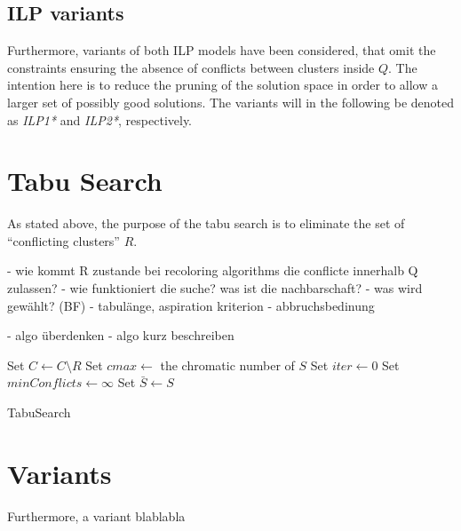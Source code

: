 \subsection{ILP variants}

Furthermore, variants of both ILP models have been considered, that omit the constraints ensuring the absence of conflicts between clusters inside $Q$. The intention here is to reduce the pruning of the solution space in order to allow a larger set of possibly good solutions. The variants will in the following be denoted as \textit{ILP1*} and \textit{ILP2*}, respectively. 

\section{Tabu Search}
\label{sec:tabu}

As stated above, the purpose of the tabu search is to eliminate the set of ``conflicting clusters'' $R$.

- wie kommt R zustande bei recoloring algorithms die conflicte innerhalb Q zulassen?
- wie funktioniert die suche? was ist die nachbarschaft?
- was wird gewählt? (BF)
- tabulänge, aspiration kriterion
- abbruchsbedinung
 
- algo überdenken
- algo kurz beschreiben

\begin{algorithm}[h]
Set $C \gets C \setminus R$\;
Set $cmax \gets$ the chromatic number of $S$\;
Set $iter \gets 0$\;
Set $minConflicts \gets \infty$\;
Set $\bar{S} \gets S$\;

\;
\caption{TabuSearch}
\label{algo:tabusearch}
\end{algorithm}

\section{Variants}
\label{sec:variants}

Furthermore, a variant blablabla